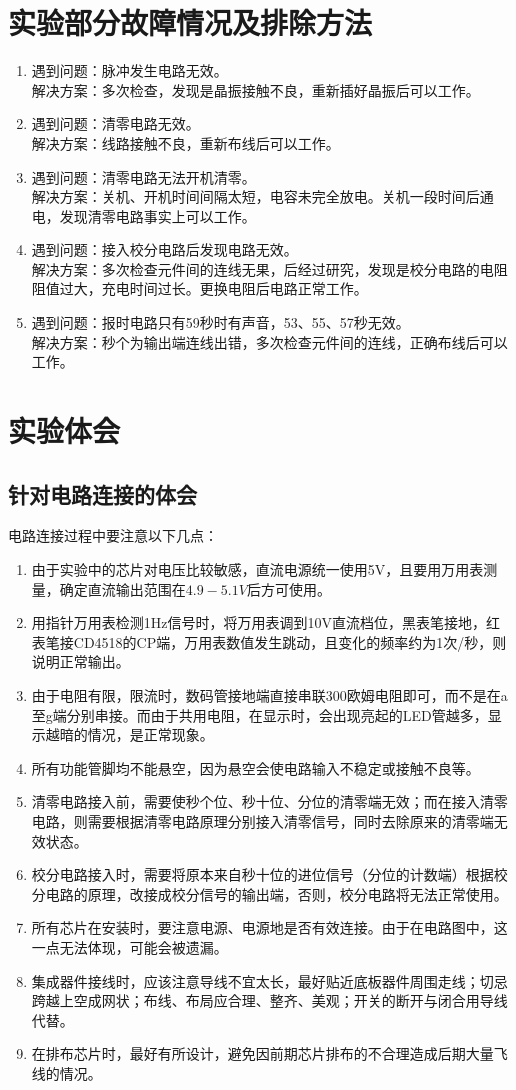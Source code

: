 \documentclass[12pt]{article}
\begin{document}
\section{实验部分故障情况及排除方法}
\begin{enumerate}
\item 遇到问题：脉冲发生电路无效。\\解决方案：多次检查，发现是晶振接触不良，重新插好晶振后可以工作。
\item 遇到问题：清零电路无效。\\解决方案：线路接触不良，重新布线后可以工作。
\item 遇到问题：清零电路无法开机清零。\\解决方案：关机、开机时间间隔太短，电容未完全放电。关机一段时间后通电，发现清零电路事实上可以工作。
\item 遇到问题：接入校分电路后发现电路无效。\\解决方案：多次检查元件间的连线无果，后经过研究，发现是校分电路的电阻阻值过大，充电时间过长。更换电阻后电路正常工作。
\item 遇到问题：报时电路只有59秒时有声音，53、55、57秒无效。\\解决方案：秒个为输出端连线出错，多次检查元件间的连线，正确布线后可以工作。
\end{enumerate}

\section{实验体会}
\subsection{针对电路连接的体会}
电路连接过程中要注意以下几点：
\begin{enumerate}
\item 由于实验中的芯片对电压比较敏感，直流电源统一使用5V，且要用万用表测量，确定直流输出范围在$4.9-5.1V$后方可使用。
\item 用指针万用表检测1Hz信号时，将万用表调到10V直流档位，黑表笔接地，红表笔接CD4518的CP端，万用表数值发生跳动，且变化的频率约为1次/秒，则说明正常输出。
\item 由于电阻有限，限流时，数码管接地端直接串联300欧姆电阻即可，而不是在a至g端分别串接。而由于共用电阻，在显示时，会出现亮起的LED管越多，显示越暗的情况，是正常现象。
\item 所有功能管脚均不能悬空，因为悬空会使电路输入不稳定或接触不良等。
\item 清零电路接入前，需要使秒个位、秒十位、分位的清零端无效；而在接入清零电路，则需要根据清零电路原理分别接入清零信号，同时去除原来的清零端无效状态。
\item 校分电路接入时，需要将原本来自秒十位的进位信号（分位的计数端）根据校分电路的原理，改接成校分信号的输出端，否则，校分电路将无法正常使用。
\item 所有芯片在安装时，要注意电源、电源地是否有效连接。由于在电路图中，这一点无法体现，可能会被遗漏。
\item 集成器件接线时，应该注意导线不宜太长，最好贴近底板器件周围走线；切忌跨越上空成网状；布线、布局应合理、整齐、美观；开关的断开与闭合用导线代替。
\item 在排布芯片时，最好有所设计，避免因前期芯片排布的不合理造成后期大量飞线的情况。
\end{enumerate}
\end{document}
